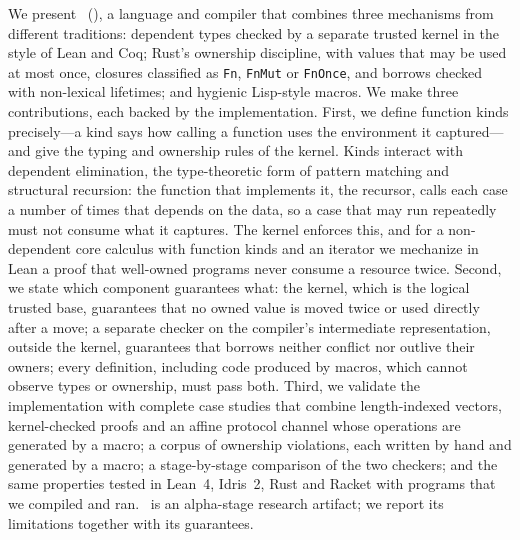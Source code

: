We present \LRL\ (\lrl), a language and compiler that combines three mechanisms from different traditions: dependent types checked by a separate trusted kernel in the style of Lean and Coq; Rust's ownership discipline, with values that may be used at most once, closures classified as \lstinline|Fn|, \lstinline|FnMut| or \lstinline|FnOnce|, and borrows checked with non-lexical lifetimes; and hygienic Lisp-style macros.
We make three contributions, each backed by the implementation.
First, we define function kinds precisely---a kind says how calling a function uses the environment it captured---and give the typing and ownership rules of the kernel. Kinds interact with dependent elimination, the type-theoretic form of pattern matching and structural recursion: the function that implements it, the recursor, calls each case a number of times that depends on the data, so a case that may run repeatedly must not consume what it captures. The kernel enforces this, and for a non-dependent core calculus with function kinds and an iterator we mechanize in Lean a proof that well-owned programs never consume a resource twice.
Second, we state which component guarantees what: the kernel, which is the logical trusted base, guarantees that no owned value is moved twice or used directly after a move; a separate checker on the compiler's intermediate representation, outside the kernel, guarantees that borrows neither conflict nor outlive their owners; every definition, including code produced by macros, which cannot observe types or ownership, must pass both.
Third, we validate the implementation with complete case studies that combine length-indexed vectors, kernel-checked proofs and an affine protocol channel whose operations are generated by a macro; a corpus of ownership violations, each written by hand and generated by a macro; a stage-by-stage comparison of the two checkers; and the same properties tested in Lean~4, Idris~2, Rust and Racket with programs that we compiled and ran.
\lrl\ is an alpha-stage research artifact; we report its limitations together with its guarantees.
